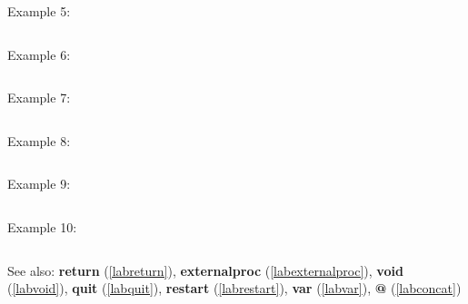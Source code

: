 \noindent Example 5: 
\begin{center}\begin{minipage}{15cm}\begin{Verbatim}[frame=single]
\end{Verbatim}
\end{minipage}\end{center}
\noindent Example 6: 
\begin{center}\begin{minipage}{15cm}\begin{Verbatim}[frame=single]
\end{Verbatim}
\end{minipage}\end{center}
\noindent Example 7: 
\begin{center}\begin{minipage}{15cm}\begin{Verbatim}[frame=single]
\end{Verbatim}
\end{minipage}\end{center}
\noindent Example 8: 
\begin{center}\begin{minipage}{15cm}\begin{Verbatim}[frame=single]
\end{Verbatim}
\end{minipage}\end{center}
\noindent Example 9: 
\begin{center}\begin{minipage}{15cm}\begin{Verbatim}[frame=single]
\end{Verbatim}
\end{minipage}\end{center}
\noindent Example 10: 
\begin{center}\begin{minipage}{15cm}\begin{Verbatim}[frame=single]
\end{Verbatim}
\end{minipage}\end{center}
See also: \textbf{return} (\ref{labreturn}), \textbf{externalproc} (\ref{labexternalproc}), \textbf{void} (\ref{labvoid}), \textbf{quit} (\ref{labquit}), \textbf{restart} (\ref{labrestart}), \textbf{var} (\ref{labvar}), \textbf{@} (\ref{labconcat})
